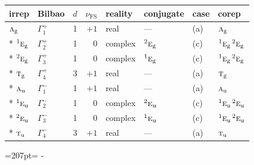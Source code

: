 \documentclass[10pt,a4paper]{article}
\newcommand{\needspace}[1]{\par\penalty-100\begingroup\dimen0=#1\relax\dimen2=\pagegoal
  \advance\dimen2-\pagetotal\ifdim\dimen0>\dimen2\relax\ifdim\dimen2>0pt\vfil\break\fi\fi
  \endgroup}
\numberwithin{equation}{section}
\newcommand{\irr}[1]{\text{\normalfont\scshape #1}}
\newcommand{\conjpair}[1]{{}^{#1}}
\newcommand{\ptag}[1]{\mathrm{#1}}
\newcommand{\fsind}{\nu_{\mathrm{FS}}}
\begin{document}
{\small\renewcommand{\arraystretch}{1.25}\setlength{\tabcolsep}{4pt}\begin{longtable}{@{}llrrllll@{}}\toprule
irrep & Bilbao & $d$ & $\fsind$ & reality & conjugate & case & corep\\\midrule\endhead
\bottomrule\endfoot\endlastfoot
$\irr{a}_{\ptag{g}}$ & $\Gamma_{1}^{+}$ & 1 & $+1$ & real & --- & (a) & $\irr{a}_{\ptag{g}}$\\*
$\conjpair{1}\irr{e}_{\ptag{g}}$ & $\Gamma_{2}^{+}$ & 1 & $0$ & complex & $\conjpair{2}\irr{e}_{\ptag{g}}$ & (c) & $\conjpair{1}\irr{e}_{\ptag{g}}\,\conjpair{2}\irr{e}_{\ptag{g}}$\\*
$\conjpair{2}\irr{e}_{\ptag{g}}$ & $\Gamma_{3}^{+}$ & 1 & $0$ & complex & $\conjpair{1}\irr{e}_{\ptag{g}}$ & (c) & $\conjpair{1}\irr{e}_{\ptag{g}}\,\conjpair{2}\irr{e}_{\ptag{g}}$\\*
$\irr{t}_{\ptag{g}}$ & $\Gamma_{4}^{+}$ & 3 & $+1$ & real & --- & (a) & $\irr{t}_{\ptag{g}}$\\*
$\irr{a}_{\ptag{u}}$ & $\Gamma_{1}^{-}$ & 1 & $+1$ & real & --- & (a) & $\irr{a}_{\ptag{u}}$\\*
$\conjpair{1}\irr{e}_{\ptag{u}}$ & $\Gamma_{2}^{-}$ & 1 & $0$ & complex & $\conjpair{2}\irr{e}_{\ptag{u}}$ & (c) & $\conjpair{1}\irr{e}_{\ptag{u}}\,\conjpair{2}\irr{e}_{\ptag{u}}$\\*
$\conjpair{2}\irr{e}_{\ptag{u}}$ & $\Gamma_{3}^{-}$ & 1 & $0$ & complex & $\conjpair{1}\irr{e}_{\ptag{u}}$ & (c) & $\conjpair{1}\irr{e}_{\ptag{u}}\,\conjpair{2}\irr{e}_{\ptag{u}}$\\*
$\irr{t}_{\ptag{u}}$ & $\Gamma_{4}^{-}$ & 3 & $+1$ & real & --- & (a) & $\irr{t}_{\ptag{u}}$\\
\bottomrule\end{longtable}}
\needspace{207pt}
\end{document}
